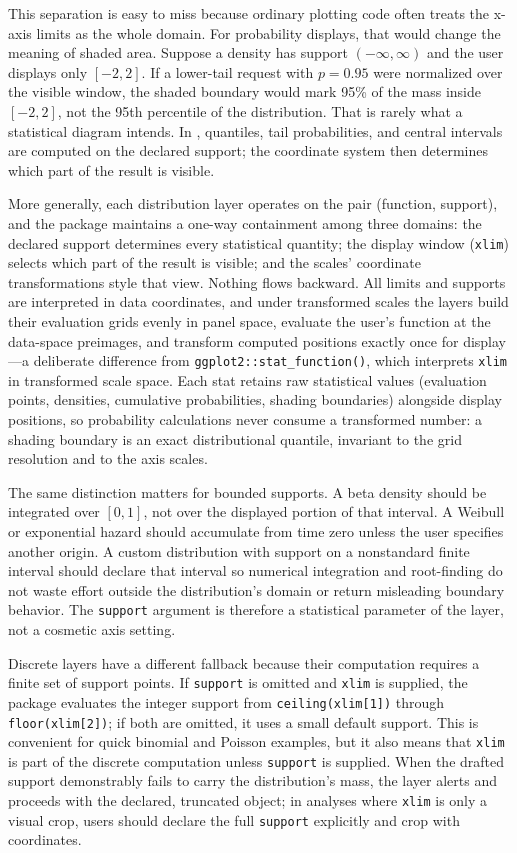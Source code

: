 This separation is easy to miss because ordinary plotting code often treats
the x-axis limits as the whole domain. For probability displays, that would
change the meaning of shaded area. Suppose a density has support
\((-\infty,\infty)\) and the user displays only \([-2,2]\). If a lower-tail request
with \(p=0.95\) were normalized over the visible window, the shaded boundary
would mark 95\% of the mass inside \([-2,2]\), not the 95th percentile of the
distribution. That is rarely what a statistical diagram intends. In
, quantiles, tail probabilities, and central intervals are
computed on the declared support; the coordinate system then determines which
part of the result is visible.

More generally, each distribution layer operates on the pair (function,
support), and the package maintains a one-way containment among three
domains: the declared support determines every statistical quantity; the
display window (\texttt{xlim}) selects which part of the result is visible; and the
scales' coordinate transformations style that view. Nothing flows backward.
All limits and supports are interpreted in data coordinates, and under
transformed scales the layers build their evaluation grids evenly in panel
space, evaluate the user's function at the data-space preimages, and
transform computed positions exactly once for display---a deliberate
difference from \texttt{ggplot2::stat\_function()}, which interprets \texttt{xlim} in
transformed scale space. Each stat retains raw statistical values
(evaluation points, densities, cumulative probabilities, shading boundaries)
alongside display positions, so probability calculations never consume a
transformed number: a shading boundary is an exact distributional quantile,
invariant to the grid resolution and to the axis scales.

The same distinction matters for bounded supports. A beta density should be
integrated over \([0,1]\), not over the displayed portion of that interval. A
Weibull or exponential hazard should accumulate from time zero unless the user
specifies another origin. A custom distribution with support on a nonstandard
finite interval should declare that interval so numerical integration and
root-finding do not waste effort outside the distribution's domain or return
misleading boundary behavior. The \texttt{support} argument is therefore a statistical
parameter of the layer, not a cosmetic axis setting.

Discrete layers have a different fallback because their computation requires a
finite set of support points. If \texttt{support} is omitted and \texttt{xlim} is supplied,
the package evaluates the integer support from \texttt{ceiling(xlim{[}1{]})} through
\texttt{floor(xlim{[}2{]})}; if both are omitted, it uses a small default support. This is
convenient for quick binomial and Poisson examples, but it also means that
\texttt{xlim} is part of the discrete computation unless \texttt{support} is supplied. When
the drafted support demonstrably fails to carry the distribution's mass, the
layer alerts and proceeds with the declared, truncated object; in analyses
where \texttt{xlim} is only a visual crop, users should declare the full \texttt{support}
explicitly and crop with coordinates.

